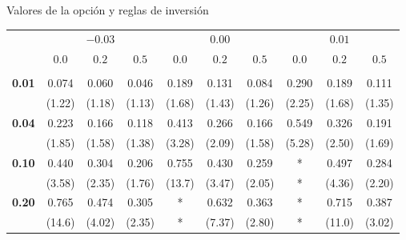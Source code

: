 \begin{frame}{Valores de la opción y reglas de inversión}
  \vspace{1mm}
  {\centering
  {\fontsize{8}{11}\selectfont
   \renewcommand{\arraystretch}{1.25}%
   \setlength{\tabcolsep}{4pt}%
   \begin{tabular}{>{\bfseries\color{navy}}l ccccccccc}
     \rowcolor{gristitulo}
     \multicolumn{1}{l}{$\alpha_\theta$}
     & \multicolumn{3}{c}{$-0.03$}
     & \multicolumn{3}{c}{$0.00$}
     & \multicolumn{3}{c}{$0.01$} \\
     \rowcolor{gristitulo}
     \multicolumn{1}{l}{$\rho_{\theta m}$}
     & $0.0$ & $0.2$ & $0.5$
     & $0.0$ & $0.2$ & $0.5$
     & $0.0$ & $0.2$ & $0.5$ \\
     \rowcolor{gristitulo}
     \multicolumn{1}{l}{$\sigma_\theta^2$} & & & & & & & & & \\
     0.01 & 0.074 & 0.060 & 0.046 & 0.189 & 0.131 & 0.084 & 0.290 & 0.189 & 0.111 \\
          & (1.22) & (1.18) & (1.13) & (1.68) & (1.43) & (1.26) & (2.25) & (1.68) & (1.35) \\ \hline
     0.04 & 0.223 & 0.166 & 0.118 & 0.413 & 0.266 & 0.166 & 0.549 & 0.326 & 0.191 \\
          & (1.85) & (1.58) & (1.38) & (3.28) & (2.09) & (1.58) & (5.28) & (2.50) & (1.69) \\ \hline
     0.10 & 0.440 & 0.304 & 0.206 & 0.755 & 0.430 & 0.259 & * & 0.497 & 0.284 \\
          & (3.58) & (2.35) & (1.76) & (13.7) & (3.47) & (2.05) & * & (4.36) & (2.20) \\ \hline
     0.20 & 0.765 & 0.474 & 0.305 & * & 0.632 & 0.363 & * & 0.715 & 0.387 \\
          & (14.6) & (4.02) & (2.35) & * & (7.37) & (2.80) & * & (11.0) & (3.02) \\
   \end{tabular}}\par}
\end{frame}

